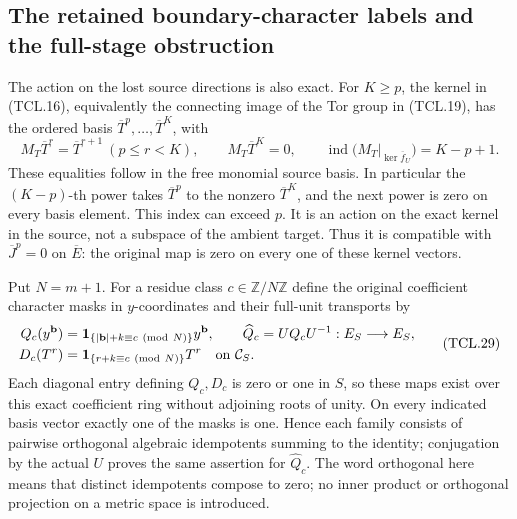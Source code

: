 \subsection{The retained boundary-character labels and the full-stage obstruction}

The action on the lost source directions is also exact. For
\(K\geq p\), the kernel in (TCL.16), equivalently the connecting
image of the Tor group in (TCL.19), has the ordered basis
\(\overline T^p,\ldots,\overline T^K\), with
\[
 M_T\overline T^r=\overline T^{r+1}\ (p\leq r<K),\qquad
 M_T\overline T^K=0,\qquad
 \operatorname{ind}\bigl(M_T|_{\ker\overline f_U}\bigr)=K-p+1.
 \tag{TCL.28}\label{eq:tcl-tor-index}
\]
These equalities follow in the free monomial source basis. In
particular the \((K-p)\)-th power takes \(\overline T^p\)
to the nonzero \(\overline T^K\), and the next power is zero
on every basis element. This index can exceed \(p\). It is an
action on the exact kernel in the source, not a subspace of the
ambient target. Thus it is compatible with
\(\overline J^p=0\) on \(\overline E\): the original map is
zero on every one of these kernel vectors.

Put \(N=m+1\). For a residue class \(c\in\mathbb Z/N\mathbb Z\)
define the original coefficient character masks in \(y\)-coordinates
and their full-unit transports by
\[
 \begin{split}
 Q_c(y^{\mathbf b})&=
       \mathbf 1_{\{|\mathbf b|+k\equiv c\ ({\rm mod}\ N)\}}
                       y^{\mathbf b},\qquad
 \widehat Q_c=UQ_cU^{-1}:E_S\longrightarrow E_S,\\
 D_c(T^r)&=\mathbf 1_{\{r+k\equiv c\ ({\rm mod}\ N)\}}T^r
                       \quad\hbox{on }\mathcal C_S.
 \end{split}
 \tag{TCL.29}\label{eq:tcl-character-mask}
\]
Each diagonal entry defining \(Q_c,D_c\) is zero or one in
\(S\), so these maps exist over this exact coefficient ring
without adjoining roots of unity. On every indicated basis vector
exactly one of the masks is one. Hence each family consists of
pairwise orthogonal algebraic idempotents summing to the identity;
conjugation by the actual \(U\) proves the same assertion for
\(\widehat Q_c\). The word orthogonal here means that distinct
idempotents compose to zero; no inner product or orthogonal
projection on a metric space is introduced.

